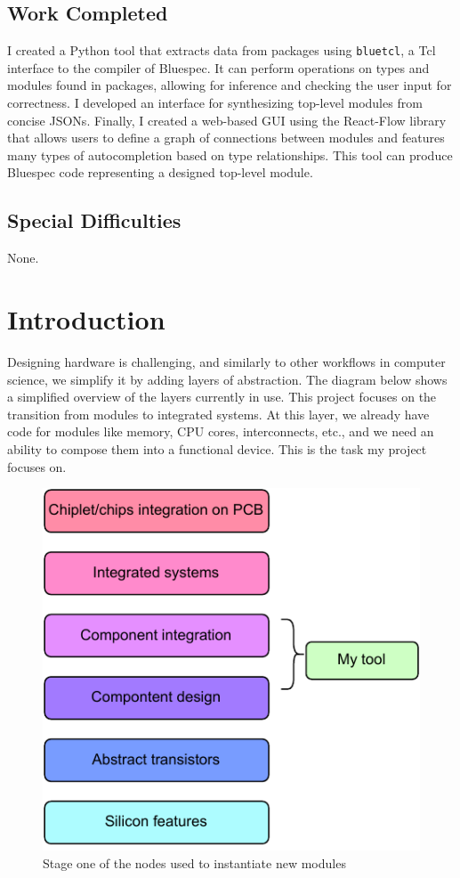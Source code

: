 \documentclass[12pt]{report}
\begin{document}
\section*{Work Completed}

I created a Python tool that extracts data from packages using \verb!bluetcl!, a Tcl interface to the compiler of Bluespec. It can perform operations on types and modules found in packages, allowing for inference and checking the user input for correctness. I developed an interface for synthesizing top-level modules from concise JSONs. Finally, I created a web-based GUI using the React-Flow library that allows users to define a graph of connections between modules and features many types of autocompletion based on type relationships. This tool can produce Bluespec code representing a designed top-level module.

\section*{Special Difficulties}

None.




\tableofcontents

\chapter{Introduction}
Designing hardware is challenging, and similarly to other workflows in computer science, we simplify it by adding layers of abstraction. The diagram below shows a simplified overview of the layers currently in use. This project focuses on the transition from modules to integrated systems. At this layer, we already have code for modules like memory, CPU cores, interconnects, etc., and we need an ability to compose them into a functional device. This is the task my project focuses on.
\begin{figure}[h!]
    \centering
    \includegraphics[width=0.5\columnwidth]{pdfExports/LargeMapLayersOfAbstraction.pdf}
    \caption{Stage one of the nodes used to instantiate new modules}
\end{figure}
%     
\end{document}
